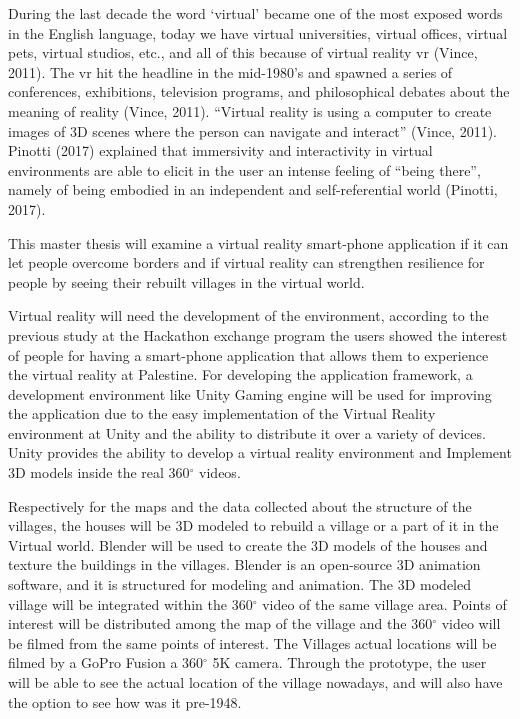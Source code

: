 During the last decade the word ‘virtual’ became one of the most exposed words in the
English language, today we have virtual universities, virtual offices, virtual pets, virtual
studios, etc., and all of this because of virtual reality \acrshort{vr} (Vince, 2011). The \acrshort{vr} hit the
headline in the mid-1980’s and spawned a series of conferences, exhibitions, television
programs, and philosophical debates about the meaning of reality (Vince, 2011). “Virtual
reality is using a computer to create images of 3D scenes where the person can navigate and
interact” (Vince, 2011). Pinotti (2017) explained that immersivity and interactivity in virtual
environments are able to elicit in the user an intense feeling of “being there”, namely of being
embodied in an independent and self-referential world (Pinotti, 2017).

This master thesis will examine a virtual reality smart-phone application if it can let people overcome borders and if virtual reality can strengthen resilience for people by seeing their rebuilt villages in the virtual world. 


Virtual reality will need the development of the environment, according to the previous study at the Hackathon exchange program the users showed the interest of people for having a smart-phone application that allows them to experience the virtual reality at Palestine. For developing the application framework, a development environment like Unity Gaming engine will be used for improving the application due to the easy implementation of the Virtual Reality environment at Unity and the ability to distribute it over a variety of devices. Unity provides the ability to develop a virtual reality environment and Implement 3D models inside the real 360$^{\circ}$ videos.


Respectively for the maps and the data collected about the structure of the villages, the houses will be 3D modeled to rebuild a village or a part of it in the Virtual world. Blender will be used to create the 3D models of the houses and texture the buildings in the villages. Blender is an open-source 3D animation software, and it is structured for modeling and animation. The 3D modeled village will be integrated within the 360$^{\circ}$ video of the same village area. Points of interest will be distributed among the map of the village and the 360$^{\circ}$ video will be filmed from the same points of interest. The Villages actual locations will be filmed by a GoPro Fusion a 360$^{\circ}$ 5K camera. Through the prototype, the user will be able to see the actual location of the village nowadays, and will also have the option to see how was it pre-1948. 

